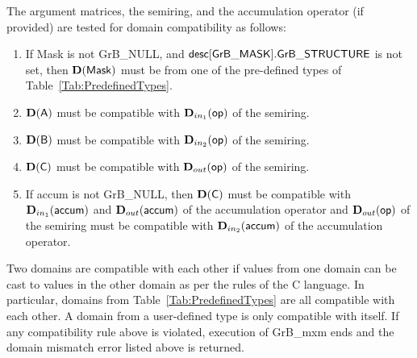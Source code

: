 The argument matrices, the semiring, and the accumulation operator (if provided) 
are tested for domain compatibility as follows:
\begin{enumerate}
	\item If {\sf Mask} is not {\sf GrB\_NULL}, and ${\sf desc[GrB\_MASK].GrB\_STRUCTURE}$
    is not set, then $\bold{D}({\sf Mask})$ must be from one of the pre-defined types of 
    Table~\ref{Tab:PredefinedTypes}.

	\item $\bold{D}({\sf A})$ must be compatible with $\mbox{$\mathbf{D}_{in_{1}}$}({\sf op})$ of the semiring.

	\item $\bold{D}({\sf B})$ must be compatible with $\mbox{$\mathbf{D}_{in_{2}}$}({\sf op})$ of the semiring.

	\item $\bold{D}({\sf C})$ must be compatible with $\mbox{$\mathbf{D}_{out}$}({\sf op})$ of the semiring. 

	\item If {\sf accum} is not {\sf GrB\_NULL}, then $\bold{D}({\sf C})$ must be
    compatible with $\mbox{$\mathbf{D}_{in_{1}}$}({\sf accum})$ and $\mbox{$\mathbf{D}_{out}$}({\sf accum})$ of the 
    accumulation operator and $\mbox{$\mathbf{D}_{out}$}({\sf op})$ of the semiring must be compatible with 
    $\mbox{$\mathbf{D}_{in_{2}}$}({\sf accum})$ of the accumulation operator.
\end{enumerate}
Two domains are compatible with each other if values from one domain can be cast 
to values in the other domain as per the rules of the C language.
In particular, domains from Table~\ref{Tab:PredefinedTypes} are all compatible 
with each other. A domain from a user-defined type is only compatible with itself.
If any compatibility rule above is violated, execution of {\sf GrB\_mxm} ends and 
the domain mismatch error listed above is returned.

